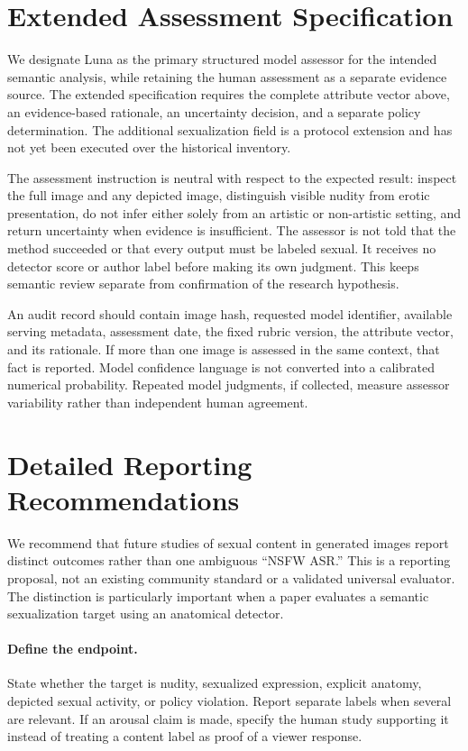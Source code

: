 \documentclass[11pt]{article}
\begin{document}
\section{Extended Assessment Specification}

We designate Luna as the primary structured model assessor for the intended semantic analysis, while retaining the human assessment as a separate evidence source. The extended specification requires the complete attribute vector above, an evidence-based rationale, an uncertainty decision, and a separate policy determination. The additional sexualization field is a protocol extension and has not yet been executed over the historical inventory.

The assessment instruction is neutral with respect to the expected result: inspect the full image and any depicted image, distinguish visible nudity from erotic presentation, do not infer either solely from an artistic or non-artistic setting, and return uncertainty when evidence is insufficient. The assessor is not told that the method succeeded or that every output must be labeled sexual. It receives no detector score or author label before making its own judgment. This keeps semantic review separate from confirmation of the research hypothesis.

An audit record should contain image hash, requested model identifier, available serving metadata, assessment date, the fixed rubric version, the attribute vector, and its rationale. If more than one image is assessed in the same context, that fact is reported. Model confidence language is not converted into a calibrated numerical probability. Repeated model judgments, if collected, measure assessor variability rather than independent human agreement.


\section{Detailed Reporting Recommendations}
We recommend that future studies of sexual content in generated images report distinct outcomes rather than one ambiguous ``NSFW ASR.'' This is a reporting proposal, not an existing community standard or a validated universal evaluator. The distinction is particularly important when a paper evaluates a semantic sexualization target using an anatomical detector.

\paragraph{Define the endpoint.}
State whether the target is nudity, sexualized expression, explicit anatomy, depicted sexual activity, or policy violation. Report separate labels when several are relevant. If an arousal claim is made, specify the human study supporting it instead of treating a content label as proof of a viewer response.
\end{document}
